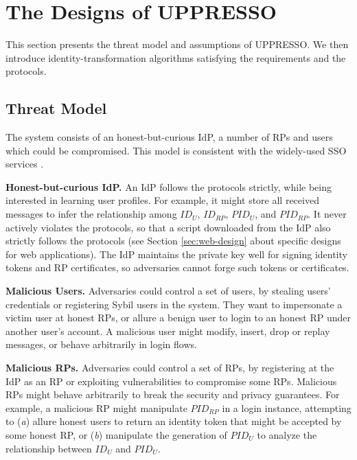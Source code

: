 
\section{The Designs of UPPRESSO}
\label{sec:UPPRESSO}

This section presents the threat model and assumptions of UPPRESSO.
We then introduce identity-transformation algorithms satisfying the requirements
    and the protocols.


\subsection{Threat Model}
The system consists of an honest-but-curious IdP, a number of RPs and users which could be compromised. %
This model is consistent with the widely-used SSO services \cite{OpenIDConnect,rfc6749,SAML,SAMLIdentifier,NIST2017draft}.

\noindent \textbf{Honest-but-curious IdP.}
An IdP follows the protocols strictly, while being interested in learning user profiles.
For example, it might store all received messages
 to infer the relationship among $ID_U$, $ID_{RP}$, $PID_{U}$, and $PID_{RP}$.
It never actively violates the protocols,
so that a script downloaded from the IdP also strictly follows the protocols (see Section \ref{sec:web-design} about specific designs
    for web applications).
The IdP maintains the private key well for signing identity tokens and RP certificates, %
so adversaries cannot forge such tokens or certificates.

\noindent \textbf{Malicious Users.}
Adversaries could control a set of users,
 by stealing users' credentials or registering Sybil users in the system.
They want to impersonate a victim user at honest RPs,
 or allure a benign user to login to an honest RP under another user's account.
A malicious user might
    modify, insert, drop or replay messages, or behave arbitrarily in login flows.

\noindent \textbf{Malicious RPs.}
Adversaries could control a set of RPs, by registering at the IdP as an RP
     or exploiting vulnerabilities to compromise some RPs.
Malicious RPs might behave arbitrarily to break the security and privacy guarantees.
For example,
a malicious RP might manipulate $PID_{RP}$ in a login instance,
    attempting to (\emph{a}) allure honest users to return an identity token that might be accepted by some honest RP,
or (\emph{b}) manipulate the generation of $PID_U$ to
    analyze the relationship between $ID_U$ and $PID_U$.


